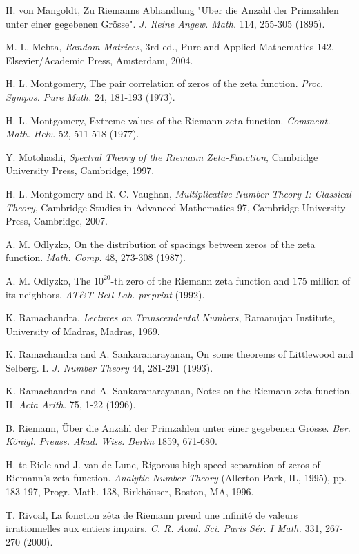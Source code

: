 \documentclass[11pt]{article}
\begin{document}
\begin{thebibliography}{99}
 H. von Mangoldt, Zu Riemanns Abhandlung "Über die Anzahl der Primzahlen unter einer gegebenen Grösse". \textit{J. Reine Angew. Math.} 114, 255-305 (1895).

 M. L. Mehta, \textit{Random Matrices}, 3rd ed., Pure and Applied Mathematics 142, Elsevier/Academic Press, Amsterdam, 2004.

 H. L. Montgomery, The pair correlation of zeros of the zeta function. \textit{Proc. Sympos. Pure Math.} 24, 181-193 (1973).

 H. L. Montgomery, Extreme values of the Riemann zeta function. \textit{Comment. Math. Helv.} 52, 511-518 (1977).

 Y. Motohashi, \textit{Spectral Theory of the Riemann Zeta-Function}, Cambridge University Press, Cambridge, 1997.

 H. L. Montgomery and R. C. Vaughan, \textit{Multiplicative Number Theory I: Classical Theory}, Cambridge Studies in Advanced Mathematics 97, Cambridge University Press, Cambridge, 2007.

 A. M. Odlyzko, On the distribution of spacings between zeros of the zeta function. \textit{Math. Comp.} 48, 273-308 (1987).

 A. M. Odlyzko, The $10^{20}$-th zero of the Riemann zeta function and 175 million of its neighbors. \textit{AT\&T Bell Lab. preprint} (1992).

 K. Ramachandra, \textit{Lectures on Transcendental Numbers}, Ramanujan Institute, University of Madras, Madras, 1969.

 K. Ramachandra and A. Sankaranarayanan, On some theorems of Littlewood and Selberg. I. \textit{J. Number Theory} 44, 281-291 (1993).

 K. Ramachandra and A. Sankaranarayanan, Notes on the Riemann zeta-function. II. \textit{Acta Arith.} 75, 1-22 (1996).

 B. Riemann, Über die Anzahl der Primzahlen unter einer gegebenen Grösse. \textit{Ber. Königl. Preuss. Akad. Wiss. Berlin} 1859, 671-680.

 H. te Riele and J. van de Lune, Rigorous high speed separation of zeros of Riemann's zeta function. \textit{Analytic Number Theory} (Allerton Park, IL, 1995), pp. 183-197, Progr. Math. 138, Birkhäuser, Boston, MA, 1996.

 T. Rivoal, La fonction zêta de Riemann prend une infinité de valeurs irrationnelles aux entiers impairs. \textit{C. R. Acad. Sci. Paris Sér. I Math.} 331, 267-270 (2000).


\end{thebibliography}
\end{document}
